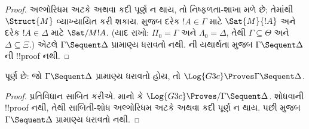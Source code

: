 \documentclass[../../../include/open-logic-section]{subfiles}
\begin{document}
\begin{proof}
  અલ્ગોરિધમ
  અટકે અથવા
  કદી પૂર્ણ ન
  થાય, તો
  નિષ્ફળતા-શાખા
  મળે છે;
  તેમાંથી
  $\Struct{M}$
  વ્યાખ્યાયિત
  કરી શકાય.
  મુજબ દરેક
  $!A \in \Gamma$
  માટે
  $\Sat{M}{!A}$
  અને દરેક
  $!A \in \Delta$
  માટે
  $\Sat/{M}{!A}$.
  (યાદ રાખો:
  $\Pi_0 = \Gamma$
  અને
  $\Lambda_0 =
  \Delta$,
  તેથી
  $\Gamma \subseteq \Theta$
  અને
  $\Delta \subseteq \Xi$.)
  એટલે
  $\Gamma \Sequent \Delta$
  પ્રામાણ્ય ધરાવતો નથી.
  ની
  યથાર્થતા મુજબ
  $\Gamma \Sequent \Delta$ની
  !!{proof}
  નથી.
\end{proof}

\begin{cor}
પૂર્ણ છે: જો
$\Gamma \Sequent \Delta$
પ્રામાણ્ય ધરાવતો હોય, તો
$\Log{G3c} \Proves \Gamma \Sequent \Delta$.
\end{cor}

\begin{proof}
  પ્રતિવિધાન
  સાબિત કરીએ.
  માનો કે
  $\Log{G3c} \Proves/ \Gamma
  \Sequent \Delta$.
  શોધવાની
  !!{proof}
  નથી, તેથી
  સાબિતી-શોધ
  અલ્ગોરિધમ
  અટકે અથવા
  કદી પૂર્ણ ન
  થાય. પછી
  મુજબ
  $\Gamma \Sequent \Delta$
  પ્રામાણ્ય ધરાવતો નથી.
\end{proof}
\end{document}
